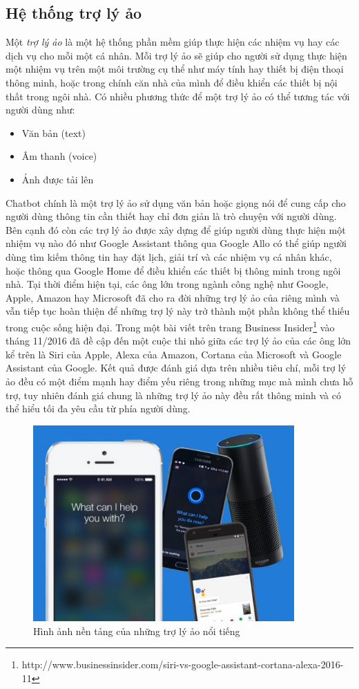 \documentclass[12pt]{report}
\begin{document}
\subsection{Hệ thống trợ lý ảo}
Một \textit{trợ lý ảo} là một hệ thống phần mềm giúp thực hiện các nhiệm vụ hay các dịch vụ cho mỗi một cá nhân. Mỗi trợ lý ảo sẽ giúp cho người sử dụng thực hiện một nhiệm vụ trên một môi trường cụ thể như máy tính hay thiết bị điện thoại thông minh, hoặc trong chính căn nhà của mình để điều khiển các thiết bị nội thất trong ngôi nhà. Có nhiều phương thức để một trợ lý ảo có thể tương tác với người dùng như:

\begin{itemize}
	\item Văn bản (text)
	\item Âm thanh (voice)
	\item Ảnh được tải lên
\end{itemize}

Chatbot chính là một trợ lý ảo sử dụng văn bản hoặc giọng nói để cung cấp cho người dùng thông tin cần thiết hay chỉ đơn giản là trò chuyện với người dùng. Bên cạnh đó còn các trợ lý ảo được xây dựng để giúp người dùng thực hiện một nhiệm vụ nào đó như Google Assistant thông qua Google Allo có thể giúp người dùng tìm kiếm thông tin hay đặt lịch, giải trí và các nhiệm vụ cá nhân khác, hoặc thông qua Google Home để điều khiển các thiết bị thông minh trong ngôi nhà. Tại thời điểm hiện tại, các ông lớn trong ngành công nghệ như Google, Apple, Amazon hay Microsoft đã cho ra đời những trợ lý ảo của riêng mình và vẫn tiếp tục hoàn thiện để những trợ lý này trở thành một phần không thể thiếu trong cuộc sống hiện đại. Trong một bài viết trên trang Business Insider{\footnote{http://www.businessinsider.com/siri-vs-google-assistant-cortana-alexa-2016-11}} vào tháng 11/2016 đã đề cập đến một cuộc thi nhỏ giữa các trợ lý ảo của các ông lớn kể trên là Siri của Apple, Alexa của Amazon, Cortana của Microsoft và Google Assistant của Google. Kết quả được đánh giá dựa trên nhiều tiêu chí, mỗi trợ lý ảo đều có một điểm mạnh hay điểm yếu riêng trong những mục mà mình chưa hỗ trợ, tuy nhiên đánh giá chung là những trợ lý ảo này đều rất thông minh và có thể hiểu tối đa yêu cầu từ phía người dùng. 

\begin{figure}[H]
  \centering
    \includegraphics[width=10cm]{Pics/Chap1/virtual-assistants.png}
  \caption{Hình ảnh nền tảng của những trợ lý ảo nổi tiếng}
\end{figure}
\end{document}
